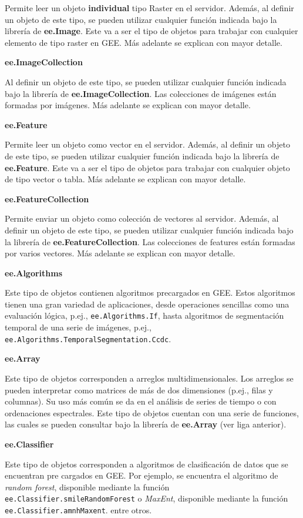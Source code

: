 \documentclass[
]{article}
\begin{document}
Permite leer un objeto \textbf{individual} tipo Raster en el servidor.
Además, al definir un objeto de este tipo, se pueden utilizar cualquier
función indicada bajo la librería de \textbf{ee.Image}. Este va a ser el
tipo de objetos para trabajar con cualquier elemento de tipo raster en
GEE. Más adelante se explican con mayor detalle.

\textbf{ee.ImageCollection}

Al definir un objeto de este tipo, se pueden utilizar cualquier función
indicada bajo la librería de \textbf{ee.ImageCollection}. Las
colecciones de imágenes están formadas por imágenes. Más adelante se
explican con mayor detalle.

\textbf{ee.Feature}

Permite leer un objeto como vector en el servidor. Además, al definir un
objeto de este tipo, se pueden utilizar cualquier función indicada bajo
la librería de \textbf{ee.Feature}. Este va a ser el tipo de objetos
para trabajar con cualquier objeto de tipo vector o tabla. Más adelante
se explican con mayor detalle.

\textbf{ee.FeatureCollection}

Permite enviar un objeto como colección de vectores al servidor. Además,
al definir un objeto de este tipo, se pueden utilizar cualquier función
indicada bajo la librería de \textbf{ee.FeatureCollection}. Las
colecciones de features están formadas por varios vectores. Más adelante
se explican con mayor detalle.

\textbf{ee.Algorithms}

Este tipo de objetos contienen algoritmos precargados en GEE. Estos
algoritmos tienen una gran variedad de aplicaciones, desde operaciones
sencillas como una evaluación lógica, p.ej., \texttt{ee.Algorithms.If},
hasta algoritmos de segmentación temporal de una serie de imágenes,
p.ej., \texttt{ee.Algorithms.TemporalSegmentation.Ccdc}.

\textbf{ee.Array}

Este tipo de objetos corresponden a arreglos multidimensionales. Los
arreglos se pueden interpretar como matrices de más de dos dimensiones
(p.ej., filas y columnas). Su uso más común se da en el análisis de
series de tiempo o con ordenaciones espectrales. Este tipo de objetos
cuentan con una serie de funciones, las cuales se pueden consultar bajo
la librería de \textbf{ee.Array} (ver liga anterior).

\textbf{ee.Classifier}

Este tipo de objetos corresponden a algoritmos de clasificación de datos
que se encuentran pre cargados en GEE. Por ejemplo, se encuentra el
algoritmo de \emph{random forest}, disponible mediante la función
\texttt{ee.Classifier.smileRandomForest} o \emph{MaxEnt}, disponible
mediante la función \texttt{ee.Classifier.amnhMaxent}. entre otros.
\end{document}
